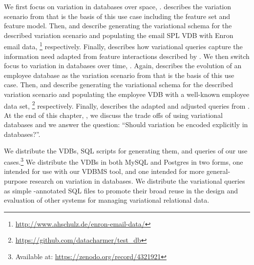 We first focus on variation in databases over space, 
.  describes the
variation scenario from \citet{Hall05} that is the basis of this use case including the feature set and
feature model. Then,  and  describe generating the variational schema for the described
variation scenario and populating the email SPL VDB with Enron email data,%
\footnote{\url{http://www.ahschulz.de/enron-email-data/}} respectively.
Finally,  describes how variational queries capture the information need 
adapted from feature interactions described by \citet{Hall05}.
%
We then switch focus to variation in databases over time,
. Again,  describes the
evolution of an employee database as the variation scenario from \citet{prima08Moon} 
that is the basis of this use case.
Then,  and  describe generating the variational 
schema for the described
variation scenario and populating the employee VDB with a well-known employee data set,%
\footnote{\url{https://github.com/datacharmer/test_db}} respectively.
Finally,  describes the adapted and adjusted queries from \citet{prima08Moon}. 
%
At the end of this chapter, , we discuss the trade offs of using variational databases and
we answer the question: ``Should variation be encoded explicitly in databases?''.


We distribute the VDBs, SQL scripts for generating them, and queries of our
use cases.\footnote{Available at: \url{https://zenodo.org/record/4321921}}
%
We distribute the VDBs in both MySQL and Postgres in two forms, one intended
for use with our VDBMS tool, and one intended for more general-purpose research
on variation in databases.
%
%
We distribute the variational queries as simple -annotated SQL files
to promote their broad reuse in the design and evaluation of other systems for
managing variational relational data.








